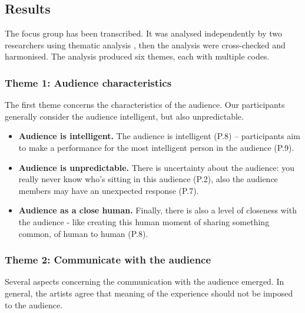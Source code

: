 \subsection{Results}

The focus group has been transcribed. It was analysed independently by two researchers using thematic analysis \cite{braun2006using}, then the analysis were cross-checked and harmonised. The analysis produced six themes, each with multiple codes.

\subsubsection{Theme 1: Audience characteristics}

The first theme concerns the characteristics of the audience. Our participants generally consider the audience intelligent, but also unpredictable.

\begin{itemize}
\item \textbf{Audience is intelligent.} The audience is intelligent (P.8) – participants aim to make a performance for the most intelligent person in the audience (P.9).
\item \textbf{Audience is unpredictable. }There is uncertainty about the audience: you really never know who’s sitting in this audience (P.2), also the audience members may have an unexpected response (P.7).
\item \textbf{Audience as a close human.} Finally, there is also a level of closeness with the audience - like creating this human moment of sharing something common, of human to human (P.8).
\end{itemize}

\subsubsection{Theme 2: Communicate with the audience}

Several aspects concerning the communication with the audience emerged. In general, the artists agree that meaning of the experience should not be imposed to the audience.

